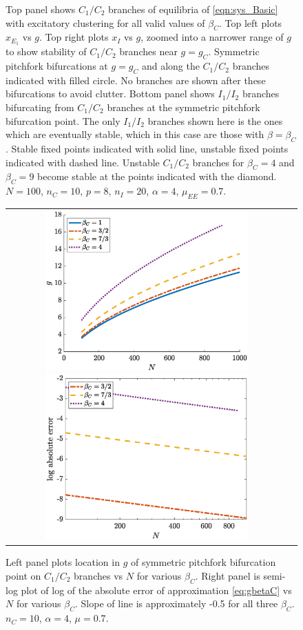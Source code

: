 \documentclass[reqno]{siamonline190516}
\begin{document}
\begin{figure}
    \caption{Top panel shows $C_1/C_2$ branches of equilibria of \cref{eqn:sys_Basic} with excitatory clustering for all valid values of $\beta_C$. Top left plots $x_{E_1}$ vs $g$. Top right plots $x_I$ vs $g$, zoomed into a narrower range of $g$ to show stability of $C_1/C_2$ branches near $g = g_C$. Symmetric pitchfork bifurcations at $g = g_C$ and along the $C_1/C_2$ branches indicated with filled circle. No branches are shown after these bifurcations to avoid clutter. Bottom panel shows $I_1/I_2$ branches bifurcating from $C_1/C_2$ branches at the symmetric pitchfork bifurcation point. The only $I_1/I_2$ branches shown here is the ones which are eventually stable, which in this case are those with $\beta = \beta_C$. Stable fixed points indicated with solid line, unstable fixed points indicated with dashed line. Unstable $C_1/C_2$ branches for $\beta_C = 4$ and $\beta_C = 9$ become stable at the points indicated with the diamond. $N = 100$, $n_C = 10$, $p = 8$, $n_I = 20$, $\alpha = 4$, $\mu_{EE} = 0.7$.}
    \label{fig:clusterBD2}
\end{figure}

\begin{figure}
    \centering
    \begin{tabular}{cc}
    \includegraphics[width=7.8cm]{images/clusterpitchgvsN.eps}
    \includegraphics[width=7.8cm]{images/pitcherrorsemilog.eps}
    \end{tabular}
    \caption{Left panel plots location in $g$ of symmetric pitchfork bifurcation point on $C_1/C_2$ branches vs $N$ for various $\beta_C$. Right panel is semi-log plot of log of the absolute error of approximation \cref{eq:gbetaC} vs $N$ for various $\beta_C$. Slope of line is approximately -0.5 for all three $\beta_C$. $n_C = 10$, $\alpha = 4$, $\mu = 0.7$.}
    \label{fig:pitcherror}
\end{figure}
\end{document}
